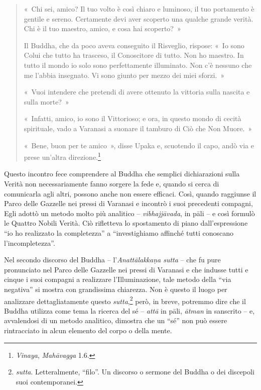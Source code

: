 \begin{quote}
«~Chi sei, amico? Il tuo volto è così chiaro e luminoso, il tuo
portamento è gentile e sereno. Certamente devi aver scoperto una qualche
grande verità. Chi è il tuo maestro, amico, e cosa hai scoperto?~»

Il Buddha, che da poco aveva conseguito il Risveglio, rispose: «~Io sono
Colui che tutto ha trasceso, il Conoscitore di tutto. Non ho maestro. In
tutto il mondo io solo sono perfettamente illuminato. Non c'è nessuno
che me l'abbia insegnato. Vi sono giunto per mezzo dei miei sforzi.~»

«~Vuoi intendere che pretendi di avere ottenuto la vittoria sulla
nascita e sulla morte?~»

«~Infatti, amico, io sono il Vittorioso; e ora, in questo mondo di
cecità spirituale, vado a Varanasi a suonare il tamburo di Ciò che Non
Muore.~»

«~Bene, buon per te amico~», disse Upaka e, scuotendo il capo, andò via e
prese un'altra direzione.\footnote{\emph{Vinaya}, \emph{Mahāvagga} 1.6.}
\end{quote}

Questo incontro fece comprendere al Buddha che semplici dichiarazioni
sulla Verità non necessariamente fanno sorgere la fede e, quando si
cerca di comunicarla agli altri, possono anche non essere efficaci.
Così, quando raggiunse il Parco delle Gazzelle nei pressi di Varanasi e
incontrò i suoi precedenti compagni, Egli adottò un metodo molto più
analitico -- \emph{vibhajjāvada}, in pāli -- e così formulò le Quattro
Nobili Verità. Ciò rifletteva lo spostamento di piano dall'espressione
``io ho realizzato la completezza'' a ``investighiamo affinché tutti
conoscano l'incompletezza''.

Nel secondo discorso del Buddha -- l'\emph{Anattālakkaṇa sutta} -- che
fu pure pronunciato nel Parco delle Gazzelle nei pressi di Varanasi e
che indusse tutti e cinque i suoi compagni a realizzare l'Illuminazione,
tale metodo della ``via negativa'' si mostra con grandissima chiarezza.
Non è questo il luogo per analizzare dettagliatamente questo
\emph{sutta},\footnote{\emph{sutta}. Letteralmente, ``filo''. Un
  discorso o sermone del Buddha o dei discepoli suoi contemporanei.}
però, in breve, potremmo dire che il Buddha utilizza come tema la
ricerca del sé -- \emph{attā} in pāli, \emph{ātman} in sanscrito -- e,
avvalendosi di un metodo analitico, dimostra che un ``sé'' non può
essere rintracciato in alcun elemento del corpo o della mente.

